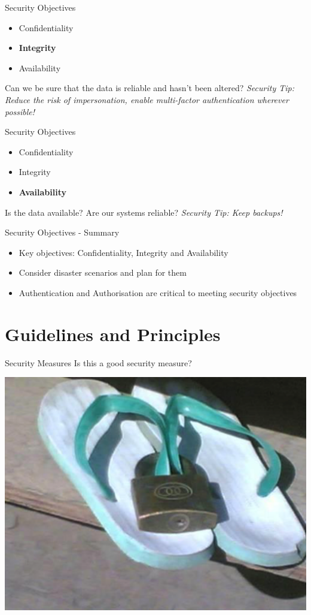 \documentclass{beamer}
\begin{document}
\begin{frame}{Security Objectives}
	\begin{itemize}
		\item Confidentiality
		\item \textbf{Integrity}
        \item Availability
	\end{itemize}
    Can we be sure that the data is reliable and hasn't been altered?
	\linebreak
    \linebreak
    { \color{red} \textit{Security Tip: Reduce the risk of impersonation, enable multi-factor authentication wherever possible!} }
\end{frame}


\begin{frame}{Security Objectives}
	\begin{itemize}
		\item Confidentiality
		\item Integrity
        \item \textbf{Availability}
	\end{itemize}
    Is the data available? Are our systems reliable?
	\linebreak
    \linebreak
    { \color{red} \textit{Security Tip: Keep backups!} }
\end{frame}


\begin{frame}{Security Objectives - Summary}
\begin{itemize}
\item Key objectives: Confidentiality, Integrity and Availability
\item Consider disaster scenarios and plan for them 
\item Authentication and Authorisation are critical to meeting security objectives
\end{itemize}
\end{frame}

\section{Guidelines and Principles}
\frame{\sectionpage}

\begin{frame}{Security Measures}
Is this a good security measure?
\begin{center}
\includegraphics[width=0.6\linewidth]{flipflops.png}
\end{center}
\end{frame}
\end{document}
